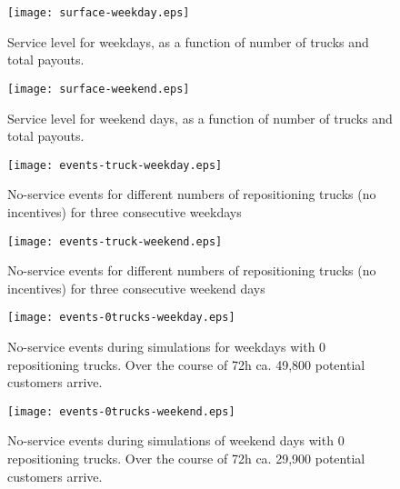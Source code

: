 \documentclass{article}
\begin{document}
\begin{subfigures}
  \begin{figure}
    \begin{minipage}[h]{.475\linewidth}
    \centering
    \texttt{[image: surface-weekday.eps]}
    \caption{Service level for weekdays, as a function of number of trucks and
      total payouts.}
    \end{minipage}
    \hfill
    \begin{minipage}[h]{.475\linewidth}
    \centering
    \texttt{[image: surface-weekend.eps]}
    \caption{Service level for weekend days, as a function of number of trucks and
      total payouts.}
    \end{minipage}
  \label{fig:servicelevel}
  \end{figure}
\end{subfigures}

\begin{subfigures}
  \begin{figure}
    \begin{minipage}[h]{.475\linewidth}
    \centering
    \texttt{[image: events-truck-weekday.eps]}
    \caption{No-service events for different numbers of repositioning trucks (no
      incentives) for three consecutive weekdays}
    \end{minipage}
    \hfill
    \begin{minipage}[h]{.475\linewidth}
    \centering
    \texttt{[image: events-truck-weekend.eps]}
    \caption{No-service events for different numbers of repositioning trucks (no
      incentives) for three consecutive weekend days}
    \end{minipage}
  \label{fig:trucks}
  \end{figure}
\end{subfigures}

\begin{subfigures}
  \begin{figure}
    \begin{minipage}[h]{.475\linewidth}
      \centering
      \texttt{[image: events-0trucks-weekday.eps]}
      \caption{No-service events during simulations for weekdays with 0
        repositioning trucks. Over the course of 72h ca. 49,800 potential
        customers arrive.}
    \end{minipage}
    \hfill
    \begin{minipage}[h]{.475\linewidth}
      \centering
      \texttt{[image: events-0trucks-weekend.eps]}
      \caption{No-service events during simulations of weekend days with 0
        repositioning trucks. Over the course of 72h ca. 29,900 potential
        customers arrive.}
    \end{minipage}
    \label{fig:incentives}
  \end{figure}
\end{subfigures}
\end{document}

